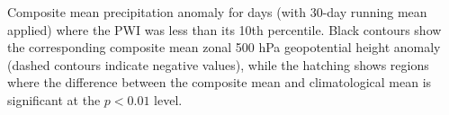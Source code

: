 \label{fig:pr_zonal_composite}
Composite mean precipitation anomaly for days (with 30-day running mean applied) where the PWI was less than its 10th percentile. Black contours show the corresponding composite mean zonal 500 hPa geopotential height anomaly (dashed contours indicate negative values), while the hatching shows regions where the difference between the composite mean and climatological mean is significant at the $p < 0.01$ level. 